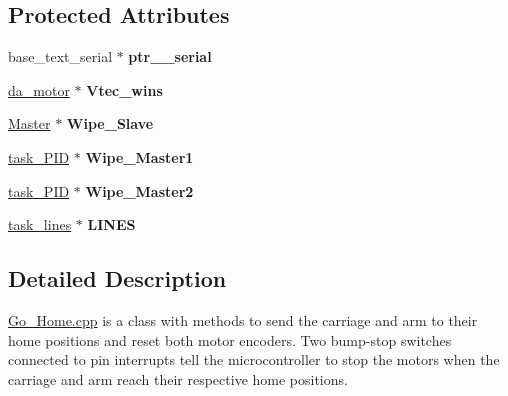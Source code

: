 \subsection*{Protected Attributes}
\begin{DoxyCompactItemize}
\item 
\hypertarget{classGo__Home_aaf0a0c125f002315ced04f6a2520faff}{base\-\_\-text\-\_\-serial $\ast$ {\bfseries ptr\-\_\-\_\-serial}}\label{classGo__Home_aaf0a0c125f002315ced04f6a2520faff}

\item 
\hypertarget{classGo__Home_a27906c7ed2cef0678fe85e7024252795}{\hyperlink{classda__motor}{da\-\_\-motor} $\ast$ {\bfseries Vtec\-\_\-wins}}\label{classGo__Home_a27906c7ed2cef0678fe85e7024252795}

\item 
\hypertarget{classGo__Home_a43872cca289815689ac830135c3d58f1}{\hyperlink{classMaster}{Master} $\ast$ {\bfseries Wipe\-\_\-\-Slave}}\label{classGo__Home_a43872cca289815689ac830135c3d58f1}

\item 
\hypertarget{classGo__Home_a57ef328cc70eabbb8668c048aad96a8d}{\hyperlink{classtask__PID}{task\-\_\-\-P\-I\-D} $\ast$ {\bfseries Wipe\-\_\-\-Master1}}\label{classGo__Home_a57ef328cc70eabbb8668c048aad96a8d}

\item 
\hypertarget{classGo__Home_adf786b11550fc9149035ed7edc398133}{\hyperlink{classtask__PID}{task\-\_\-\-P\-I\-D} $\ast$ {\bfseries Wipe\-\_\-\-Master2}}\label{classGo__Home_adf786b11550fc9149035ed7edc398133}

\item 
\hypertarget{classGo__Home_a5e9d6df4b4ee935e5266487bc9ce2fda}{\hyperlink{classtask__lines}{task\-\_\-lines} $\ast$ {\bfseries L\-I\-N\-E\-S}}\label{classGo__Home_a5e9d6df4b4ee935e5266487bc9ce2fda}

\end{DoxyCompactItemize}


\subsection{Detailed Description}
\hyperlink{Go__Home_8cpp}{Go\-\_\-\-Home.\-cpp} is a class with methods to send the carriage and arm to their home positions and reset both motor encoders. Two bump-\/stop switches connected to pin interrupts tell the microcontroller to stop the motors when the carriage and arm reach their respective home positions. 

